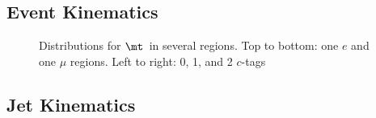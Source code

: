 \newcommand{\onelepcaption}[1]{
\caption[#1\ distributions for control and validation regions]{Distributions for \lowercase{#1}\ in several regions. Top to bottom: one $e$ and one $\mu$ regions. Left to right: 0, 1, and 2 $c$-tags}
}

\subsection{Event Kinematics}
\label{app:plots_event_kinematics}

\begin{figure}[bh!]
\end{figure}

\newcommand{\deltar}{\Delta R}  %
\begin{figure}
\crvrcaption{$\deltar(j_1,j_2)$}
\end{figure}

\begin{figure}
\onelepcaption{$\mt$}
\end{figure}

\begin{figure}
\crvrcaption{$\met$}
\end{figure}

\begin{figure}
\crvrcaption{$\mcc$}
\end{figure}

\begin{figure}
\crvrcaption{$\mct$}
\end{figure}


\clearpage

\subsection{Jet Kinematics}
\label{app:plots_jet_kinematics}

\begin{figure}[bh!]
\end{figure}


